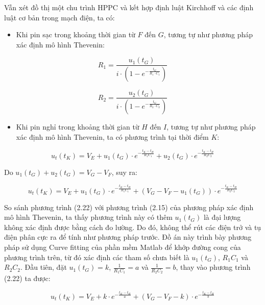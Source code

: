 \documentclass{thesis}
\begin{document}
Vẫn xét đồ thị một chu trình HPPC và kết hợp định luật Kirchhoff và các định luật cơ bản trong mạch điện, ta có:

\begin{itemize}
    \item Khi pin sạc trong khoảng thời gian từ \( F \) đến \( G \), tương tự như phương pháp xác định mô hình Thevenin:
\end{itemize}

\begin{equation}
R_1 = \frac{u_1(t_G)}{i \cdot (1 - e^{-\frac{t_G}{R_1 \cdot C_1}})} 
\end{equation}

\begin{equation}
R_2 = \frac{u_2(t_G)}{i \cdot (1 - e^{-\frac{t_G}{R_2 \cdot C_2}})} 
\end{equation}

\begin{itemize}
    \item Khi pin nghỉ trong khoảng thời gian từ \( H \) đến \( I \), tương tự như phương pháp xác định mô hình Thevenin, ta có phương trình tại thời điểm \( K \):
\end{itemize}

\begin{equation}
u_t(t_K) = V_E + u_1(t_G) \cdot e^{-\frac{t_K - t_H}{R_1 C_1}} + u_2(t_G) \cdot e^{-\frac{t_K - t_H}{R_2 C_2}} 
\end{equation}

Do \( u_1(t_G) + u_2(t_G) = V_G - V_F \), suy ra:

\begin{equation}
u_t(t_K) = V_E + u_1(t_G) \cdot e^{-\frac{t_K - t_H}{R_1 C_1}} + (V_G - V_F - u_1(t_G)) \cdot e^{-\frac{t_K - t_H}{R_2 C_2}} 
\end{equation}

So sánh phương trình (2.22) với phương trình (2.15) của phương pháp xác định mô hình Thevenin, ta thấy phương trình này có thêm \( u_1(t_G) \) là đại lượng không xác định được bằng cách đo lường. Do đó, không thể rút các điện trở và tụ điện phân cực ra để tính như phương pháp trước. Đồ án này trình bày phương pháp sử dụng Curve fitting của phần mềm Matlab để khớp đường cong của phương trình trên, từ đó xác định các tham số chưa biết là \( u_1(t_G) \), \( R_1 C_1 \) và \( R_2 C_2 \). Đầu tiên, đặt \( u_1(t_G) = k \), \( \frac{1}{R_1 C_1} = a \) và \( \frac{1}{R_2 C_2} = b \), thay vào phương trình (2.22) ta được:

\begin{equation}
u_t(t_K) = V_E + k \cdot e^{-\frac{t_K - t_H}{a}} + (V_G - V_F - k) \cdot e^{-\frac{t_K - t_H}{b}} 
\end{equation}
\end{document}
